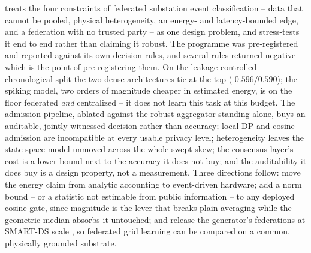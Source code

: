 \sysname{} treats the four constraints of federated substation event
classification -- data that cannot be pooled, physical heterogeneity, an
energy- and latency-bounded edge, and a federation with no trusted party
-- as one design problem, and stress-tests it end to end rather than
claiming it robust. The programme was pre-registered and reported
against its own decision rules, and several rules returned negative --
which is the point of pre-registering them. On the leakage-controlled
chronological split the two dense architectures tie at the top
(\macroF{} $0.596$/$0.590$); the spiking model, two orders of magnitude
cheaper in estimated energy, is on the floor federated \emph{and}
centralized -- it does not learn this task at this budget. The admission
pipeline, ablated against the robust aggregator standing alone, buys an
auditable, jointly witnessed decision rather than accuracy; local DP and
cosine admission are incompatible at every usable privacy level;
heterogeneity leaves the state-space model unmoved across the whole
swept skew; the consensus layer's cost is a lower bound next to the
accuracy it does not buy; and the auditability it does buy is a design
property, not a measurement. Three directions follow: move the energy
claim from analytic accounting to event-driven hardware; add a norm
bound -- or a statistic not estimable from public information -- to any
deployed cosine gate, since magnitude is the lever that breaks plain
averaging while the geometric median absorbs it untouched; and release
the generator's federations at SMART-DS scale \cite{smartds}, so
federated grid learning can be compared on a common, physically grounded
substrate.
